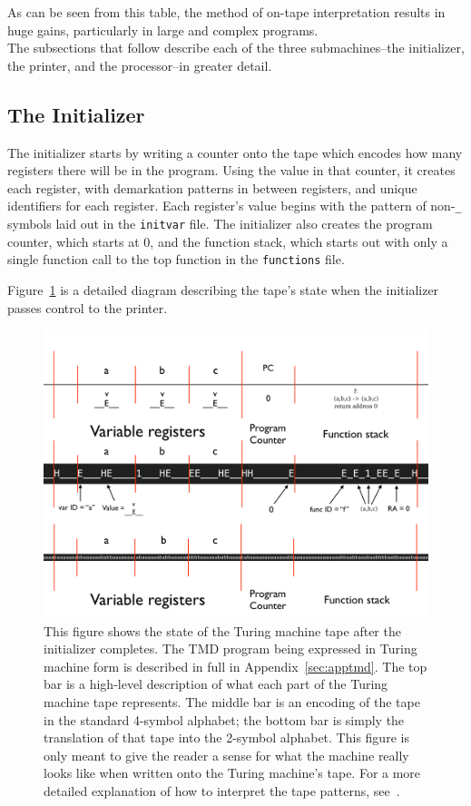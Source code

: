 \documentclass[11pt]{article}
\begin{document}
As can be seen from this table, the method of on-tape interpretation results in huge gains, particularly in large and complex programs. \\

The subsections that follow describe each of the three submachines--the initializer, the printer, and the processor--in greater detail.
 
\subsection{The Initializer}

The initializer starts by writing a counter onto the tape which encodes how many registers there will be in the program. Using the value in that counter, it creates each register, with demarkation patterns in between registers, and unique identifiers for each register. Each register's value begins with the pattern of non-\texttt{\_} symbols laid out in the \texttt{initvar} file. The initializer also creates the program counter, which starts at 0, and the function stack, which starts out with only a single function call to the top function in the \texttt{functions} file.

Figure~\ref{fig:postinit} is a detailed diagram describing the tape's state when the initializer passes control to the printer. 

\begin{figure} 
\begin{center} 
\includegraphics[scale=0.42]{figs/postinit.png}
\caption{This figure shows the state of the Turing machine tape after the initializer completes. The TMD program being expressed in Turing machine form is described in full in Appendix~\ref{sec:apptmd}. The top bar is a high-level description of what each part of the Turing machine tape represents. The middle bar is an encoding of the tape in the standard 4-symbol alphabet; the bottom bar is simply the translation of that tape into the 2-symbol alphabet. This figure is only meant to give the reader a sense for what the machine really looks like when written onto the Turing machine's tape. For a more detailed explanation of how to interpret the tape patterns, see~\cite{github}. \label{fig:postinit}} 
\end{center} 
\end{figure}
\end{document}
